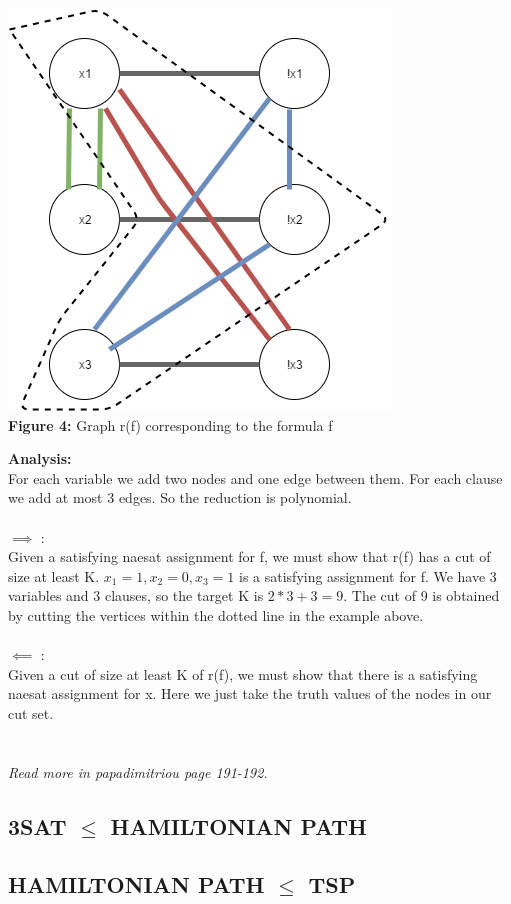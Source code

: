 \documentclass{article}
\begin{document}
\begin{center}
\includegraphics[scale=0.5]{NAESATtoMAXCUT}\\
\textbf{Figure 4:} Graph r(f) corresponding to the formula f
\end{center}

\textbf{Analysis:}\\
For each variable we add two nodes and one edge between them. For each clause we add at most 3 edges. So the reduction is polynomial.\\\\
$\implies$ :\\
Given a satisfying naesat assignment for f, we must show that r(f) has a cut of size at least K. $x_1 = 1, x_2 = 0, x_3 = 1$ is a satisfying assignment for f. We have 3 variables and 3 clauses, so the target K is $2*3+3 = 9$. The cut of 9 is obtained by cutting the vertices within the dotted line in the example above. 
\\\\
$\impliedby$ :\\
Given a cut of size at least K of r(f), we must show that there is a satisfying naesat assignment for x. Here we just take the truth values of the nodes in our cut set.
\\\\\\
\textit{Read more in papadimitriou page 191-192.}
\subsection{3SAT $\le$ HAMILTONIAN PATH}
\subsection{HAMILTONIAN PATH $\le$ TSP}
\end{document}
